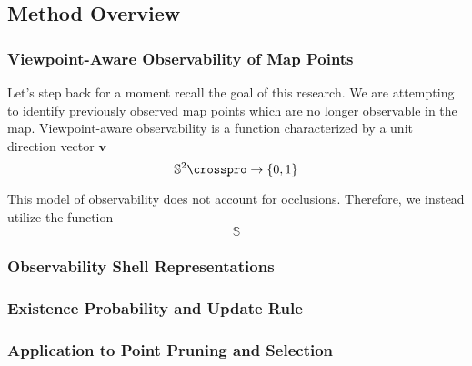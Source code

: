 \subsection{Method Overview}

\subsubsection{Viewpoint-Aware Observability of Map Points}


Let's step back for a moment recall the goal of this research. We are attempting to identify previously observed map points which are no longer observable in the map. Viewpoint-aware observability is a function characterized by a unit direction vector $\mathbf{v}$
$$
    \mathbb{S}^2\crosspro\rightarrow\{0,1\}
$$


This model of observability does not account for occlusions. Therefore, we instead utilize the function
$$
    \mathbb{S}
$$



\subsubsection{Observability Shell Representations}

\subsubsection{Existence Probability and Update Rule}

\subsubsection{Application to Point Pruning and Selection}
